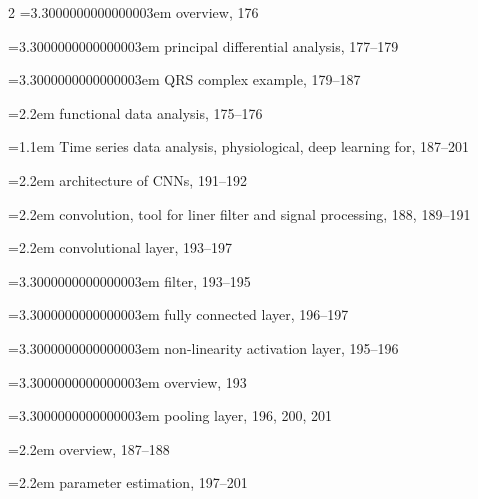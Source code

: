 \begin{multicols}{2}
\noindent\hangindent=3.3000000000000003em \hspace*{2.2em}overview, 176\par
\noindent\hangindent=3.3000000000000003em \hspace*{2.2em}principal differential analysis, 177--179\par
\noindent\hangindent=3.3000000000000003em \hspace*{2.2em}QRS complex example, 179--187\par
\noindent\hangindent=2.2em \hspace*{1.1em}functional data analysis, 175--176\par
\noindent\hangindent=1.1em Time series data analysis, physiological, deep learning for, 187--201\par
\noindent\hangindent=2.2em \hspace*{1.1em}architecture of CNNs, 191--192\par
\noindent\hangindent=2.2em \hspace*{1.1em}convolution, tool for liner filter and signal processing, 188, 189--191\par
\noindent\hangindent=2.2em \hspace*{1.1em}convolutional layer, 193--197\par
\noindent\hangindent=3.3000000000000003em \hspace*{2.2em}filter, 193--195\par
\noindent\hangindent=3.3000000000000003em \hspace*{2.2em}fully connected layer, 196--197\par
\noindent\hangindent=3.3000000000000003em \hspace*{2.2em}non-linearity activation layer, 195--196\par
\noindent\hangindent=3.3000000000000003em \hspace*{2.2em}overview, 193\par
\noindent\hangindent=3.3000000000000003em \hspace*{2.2em}pooling layer, 196, 200, 201\par
\noindent\hangindent=2.2em \hspace*{1.1em}overview, 187--188\par
\noindent\hangindent=2.2em \hspace*{1.1em}parameter estimation, 197--201\par

\end{multicols}
